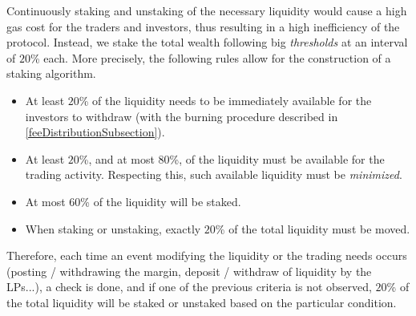 \documentclass [10pt, fancyhdr, twoside] {article}
\begin{document}
Continuously staking and unstaking of the necessary liquidity would cause a high gas cost for the traders and investors, thus resulting in a high inefficiency of the protocol. Instead, we stake the total wealth following big \textit{thresholds} at an interval of $20$\% each. More precisely, the following rules allow for the construction of a staking algorithm.
\begin{itemize}
\item At least $20$\% of the liquidity needs to be immediately available for the investors to withdraw (with the burning procedure described in \ref{feeDistributionSubsection}).
\item At least $20$\%, and at most $80$\%, of the liquidity must be available for the trading activity. Respecting this, such available liquidity must be \textit{minimized}.
\item At most $60$\% of the liquidity will be staked.
\item When staking or unstaking, exactly $20$\% of the total liquidity must be moved.
\end{itemize}

Therefore, each time an event modifying the liquidity or the trading needs occurs (posting / withdrawing the margin, deposit / withdraw of liquidity by the LPs...), a check is done, and if one of the previous criteria is not observed, $20$\% of the total liquidity will be staked or unstaked based on the particular condition.
\end{document}
